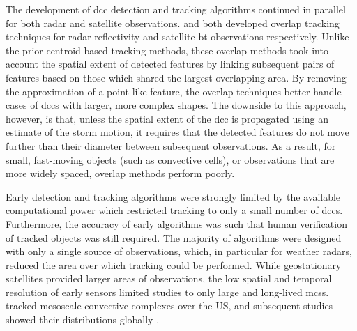 The development of \acrshort{dcc} detection and tracking algorithms continued in parallel for both radar and satellite observations.
\citet{rosenfeld_objective_1987} and \citet{williams_satellite-observed_1987} both developed overlap tracking techniques for radar reflectivity and satellite \acrshort{bt} observations respectively.
Unlike the prior centroid-based tracking methods, these overlap methods took into account the spatial extent of detected features by linking subsequent pairs of features based on those which shared the largest overlapping area.
By removing the approximation of a point-like feature, the overlap techniques better handle cases of \acrshort{dcc}s with larger, more complex shapes.
The downside to this approach, however, is that, unless the spatial extent of the \acrshort{dcc} is propagated using an estimate of the storm motion, it requires that the detected features do not move further than their diameter between subsequent observations.
As a result, for small, fast-moving objects (such as convective cells), or observations that are more widely spaced, overlap methods perform poorly.

Early detection and tracking algorithms were strongly limited by the available computational power which restricted tracking to only a small number of \acrshort{dcc}s. 
Furthermore, the accuracy of early algorithms was such that human verification of tracked objects was still required. 
The majority of algorithms were designed with only a single source of observations, which, in particular for weather radars, reduced the area over which tracking could be performed. 
While geostationary satellites provided larger areas of observations, the low spatial and temporal resolution of early sensors limited studies to only large and long-lived \acrshort{mcs}s. 
\citet{maddox_mesoscale_1980a} tracked mesoscale convective complexes over the US, and subsequent studies showed their distributions globally \citep{laing_global_1997}.

